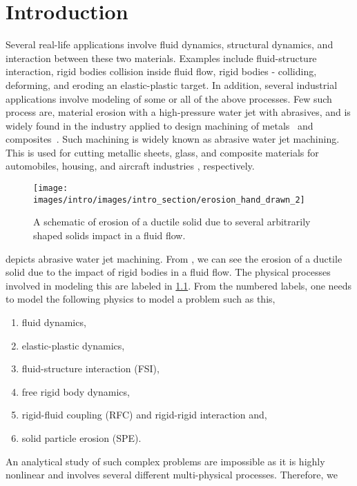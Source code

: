 \chapter{Introduction}
\label{chap:SPH}
Several real-life applications involve fluid dynamics, structural dynamics, and
interaction between these two materials. Examples include fluid-structure
interaction, rigid bodies collision inside fluid flow, rigid bodies - colliding,
deforming, and eroding an elastic-plastic target. In addition, several
industrial applications involve modeling of some or all of the above processes.
Few such process are, material erosion with a high-pressure water jet with
abrasives, and is widely found in the industry applied to design machining of
metals~\parencite{llanto_recent_2021} and composites~\parencite{alberdi_composite_2013}.
Such machining is widely known as abrasive water jet machining. This is used for
cutting metallic sheets, glass, and composite materials for automobiles,
housing, and aircraft industries
\parencite{alberdi_composite_2013,aich_abrasive_2014,llanto_recent_2021},
respectively.
\begin{figure}
  \centering
  \texttt{[image: images/intro/images/intro\_section/erosion\_hand\_drawn\_2]}
  \caption{A schematic of erosion of a ductile solid due to several arbitrarily
    shaped solids impact in a fluid flow.}
\label{fig:intro-big-picture}
\end{figure}
 depicts abrasive water jet machining. From
, we can see the erosion of a ductile solid due to
the impact of rigid bodies in a fluid flow. The physical processes involved in
modeling this are labeled in \cref{fig:intro-big-picture}. From the numbered
labels, one needs to model the following physics to model a problem such as this,
\begin{enumerate}
\item fluid dynamics,
\item elastic-plastic dynamics,
\item fluid-structure interaction (FSI),
\item free rigid body dynamics,
\item rigid-fluid coupling (RFC) and rigid-rigid interaction and,
\item solid particle erosion (SPE).
\end{enumerate}
An analytical study of such complex problems are impossible as it is highly
nonlinear and involves several different multi-physical processes. Therefore, we
